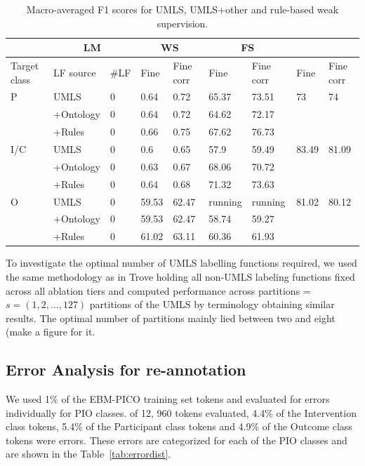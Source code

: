 \documentclass[10.7pt,]{article}
\begin{document}
\begin{table}[!ht]
    \centering
    \begin{tabular}{|l|l|l|l|l|l|l|l|l|}
        \hline
        \Xhline{1pt}
        \multicolumn{3}{|c|}{} & \multicolumn{2}{|c|}{LM} & \multicolumn{2}{|c|}{WS} & \multicolumn{2}{|c|}{FS} \\
        \hline
        Target class & LF source & \#LF & Fine & Fine corr & Fine & Fine corr & Fine & Fine corr \\
        \hline
        \Xhline{1pt}
        P & UMLS & 0 & 0.64 & 0.72 & 65.37 & 73.51 & 73 & 74 \\ 
        ~ & +Ontology & 0 & 0.64 & 0.72 & 64.62 & 72.17 & ~ & ~ \\ 
        ~ & +Rules & 0 & 0.66 & 0.75 & 67.62 & 76.73 & ~ & ~ \\ 
        I/C & UMLS & 0 & 0.6 & 0.65 & 57.9 & 59.49 & 83.49 & 81.09 \\ 
        ~ & +Ontology & 0 & 0.63 & 0.67 & 68.06 & 70.72 & ~ & ~ \\ 
        ~ & +Rules & 0 & 0.64 & 0.68 & 71.32 & 73.63 & ~ & ~ \\ 
        O & UMLS & 0 & 59.53 & 62.47 & running & running & 81.02 & 80.12 \\ 
        ~ & +Ontology & 0 & 59.53 & 62.47 & 58.74 & 59.27 & ~ & ~ \\ 
        ~ & +Rules & 0 & 61.02 & 63.11 & 60.36 & 61.93 & ~ & ~ \\ \hline
    \end{tabular}
    \caption{\label{tab:res} Macro-averaged F1 scores for UMLS, UMLS+other and rule-based weak supervision.}
\end{table}


To investigate the optimal number of UMLS labelling functions required, we used the same methodology as in Trove holding all non-UMLS labeling functions fixed across all ablation tiers and computed performance across partitions = $s = ( 1, 2, \dotso , 127 )$ partitions of the UMLS by terminology obtaining similar results.
The optimal number of partitions mainly lied between two and eight (make a figure for it.


%
%
%
\subsection{Error Analysis for re-annotation}\label{subsec:err}
%
We used 1\% of the EBM-PICO training set tokens and evaluated for errors individually for PIO classes.
of 12, 960 tokens evaluated, 4.4\% of the Intervention class tokens, 5.4\% of the Participant class tokens and 4.9\% of the Outcome class tokens were errors.
These errors are categorized for each of the PIO classes and are shown in the Table~\ref{tab:errordist}.
%
\end{document}

